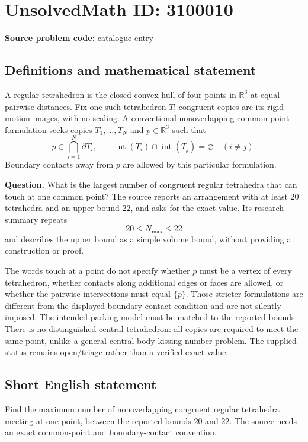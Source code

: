 \documentclass[11pt]{article}
\begin{document}
\section*{UnsolvedMath ID: 3100010}
\textbf{Source problem code:} catalogue entry
\subsection{Definitions and mathematical statement}
A regular tetrahedron is the closed convex hull of four points in $\mathbb R^3$ at equal pairwise distances. Fix one such tetrahedron $T$; congruent copies are its rigid-motion images, with no scaling. A conventional nonoverlapping common-point formulation seeks copies $T_1,\ldots,T_N$ and $p\in\mathbb R^3$ such that
\[
p\in\bigcap_{i=1}^{N}\partial T_i,\qquad
\operatorname{int}(T_i)\cap\operatorname{int}(T_j)=\varnothing
\quad(i\ne j).
\]
Boundary contacts away from $p$ are allowed by this particular formulation.

\textbf{Question.} What is the largest number of congruent regular tetrahedra that can touch at one common point? The source reports an arrangement with at least $20$ tetrahedra and an upper bound $22$, and asks for the exact value. Its research summary repeats
\[
20\leq N_{\max}\leq22
\]
and describes the upper bound as a simple volume bound, without providing a construction or proof.

The words touch at a point do not specify whether $p$ must be a vertex of every tetrahedron, whether contacts along additional edges or faces are allowed, or whether the pairwise intersections must equal $\{p\}$. Those stricter formulations are different from the displayed boundary-contact condition and are not silently imposed. The intended packing model must be matched to the reported bounds. There is no distinguished central tetrahedron: all copies are required to meet the same point, unlike a general central-body kissing-number problem. The supplied status remains open/triage rather than a verified exact value.
\subsection{Short English statement}
Find the maximum number of nonoverlapping congruent regular tetrahedra meeting at one point, between the reported bounds $20$ and $22$. The source needs an exact common-point and boundary-contact convention.
\end{document}
